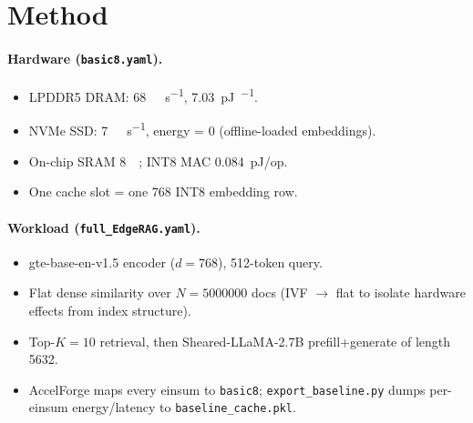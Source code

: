 \documentclass[11pt]{article}
\begin{document}
\section{Method}

\paragraph{Hardware (\texttt{basic8.yaml}).}
\begin{itemize}
  \item LPDDR5 DRAM: \SI{68}{\giga\byte\per\second}, \SI{7.03}{\pico\joule\per\bit}.
  \item NVMe SSD: \SI{7}{\giga\byte\per\second}, energy = 0 (offline-loaded embeddings).
  \item On-chip SRAM \SI{8}{\mega\byte}; INT8 MAC \SI{0.084}{\pico\joule}/op.
  \item One cache slot = one \SI{768}{\byte} INT8 embedding row.
\end{itemize}

\paragraph{Workload (\texttt{full\_EdgeRAG.yaml}).}
\begin{itemize}
  \item gte-base-en-v1.5 encoder ($d{=}768$), 512-token query.
  \item Flat dense similarity over $N{=}\num{5000000}$ docs (IVF $\to$ flat to isolate hardware effects from index structure).
  \item Top-$K{=}10$ retrieval, then Sheared-LLaMA-2.7B prefill+generate of length \num{5632}.
  \item AccelForge maps every einsum to \texttt{basic8}; \texttt{export\_baseline.py} dumps per-einsum energy/latency to \texttt{baseline\_cache.pkl}.
\end{itemize}
\end{document}
